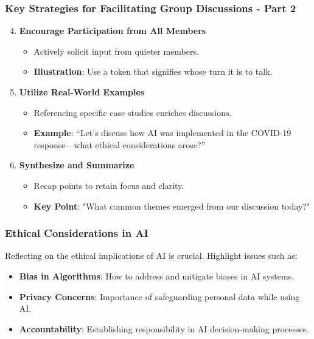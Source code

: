 \documentclass{beamer}
\begin{document}
\begin{frame}[fragile]
    \frametitle{Key Strategies for Facilitating Group Discussions - Part 2}
    \begin{enumerate}
        \setcounter{enumi}{3} %
        \item \textbf{Encourage Participation from All Members}
        \begin{itemize}
            \item Actively solicit input from quieter members.
            \item \textbf{Illustration}: Use a token that signifies whose turn it is to talk.
        \end{itemize}

        \item \textbf{Utilize Real-World Examples}
        \begin{itemize}
            \item Referencing specific case studies enriches discussions.
            \item \textbf{Example}: “Let’s discuss how AI was implemented in the COVID-19 response—what ethical considerations arose?”
        \end{itemize}

        \item \textbf{Synthesize and Summarize}
        \begin{itemize}
            \item Recap points to retain focus and clarity.
            \item \textbf{Key Point}: "What common themes emerged from our discussion today?"
        \end{itemize}
    \end{enumerate}
\end{frame}

\begin{frame}[fragile]
    \frametitle{Ethical Considerations in AI}
    Reflecting on the ethical implications of AI is crucial. Highlight issues such as:
    \begin{itemize}
        \item \textbf{Bias in Algorithms}: How to address and mitigate biases in AI systems.
        \item \textbf{Privacy Concerns}: Importance of safeguarding personal data while using AI.
        \item \textbf{Accountability}: Establishing responsibility in AI decision-making processes.
    \end{itemize}
\end{frame}
\end{document}
